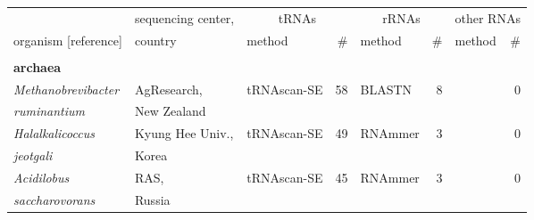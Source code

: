 \begin{footnotesize}
\begin{table}
\label{tbl:genomes}       
\begin{center}
\begin{tabular}{|ll|lr|lr|lr|}
\hline
                                         & sequencing center,&\multicolumn{2}{c|}{tRNAs}&\multicolumn{2}{c|}{rRNAs}& \multicolumn{2}{c|}{other RNAs} \\ \cline{3-8}
organism [reference]                     & country           & method        & \#       & method         & \# & method & \# \\ \hline
\multicolumn{8}{l}{} \\
\multicolumn{8}{l}{\textbf{archaea}} \\ \hline
\emph{Methanobrevibacter}                & AgResearch,       & tRNAscan-SE   & 58       & BLASTN         & 8  &                & 0        \\
\emph{ruminantium}                       & New Zealand       &               &          &                &    &                &          \\ \hline
\emph{Halalkalicoccus}                   & Kyung Hee Univ.,  & tRNAscan-SE   & 49       & RNAmmer        & 3  &                & 0        \\
\emph{jeotgali}                          & Korea             &               &          &                &    &                &          \\ \hline
\emph{Acidilobus}                        & RAS,              & tRNAscan-SE   & 45       & RNAmmer        & 3  &                & 0        \\
\emph{saccharovorans}                    & Russia            &               &          &                &    &                &          \\ \hline

\end{tabular}
\end{center}
\end{table}
\end{footnotesize}
